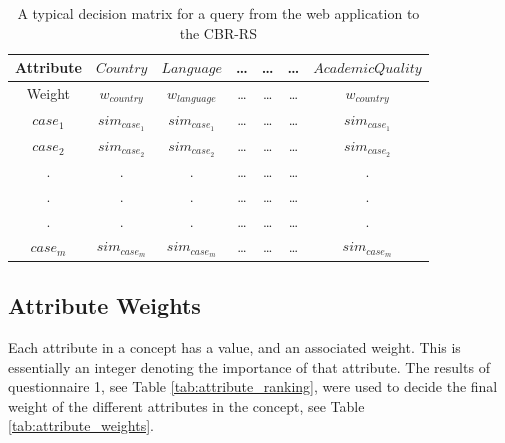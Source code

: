 \begin{table}[h]
\centering
\caption{A typical decision matrix for a query from the web application to the CBR-RS}
\label{tab:decision_matrix}
\begin{tabular}{|c|c|c|c|c|c|c|}
 \hline 
Attribute             & $Country$             & $Language$            & \ldots               & \ldots               & \ldots               & $AcademicQuality$     \\\hline 
Weight                & $w_{country}$         & $w_{language}$        & \ldots               & \ldots               & \ldots               & $w_{country}$         \\\hline \hline
$case_{1}$            & $sim_{case_{1}}$      & $sim_{case_{1}}$      & \ldots               & \ldots               & \ldots               & $sim_{case_{1}}$      \\
$case_{2}$            & $sim_{case_{2}}$      & $sim_{case_{2}}$      & \ldots               & \ldots               & \ldots               & $sim_{case_{2}}$      \\
. & . & . & \ldots               & \ldots               & \ldots               & . \\
. & . & . & \ldots               & \ldots               & \ldots               & . \\
. & . & . & \ldots               & \ldots               & \ldots               & . \\
$case_{m}$            & $sim_{case_{m}}$      & $sim_{case_{m}}$      & \ldots               & \ldots               & \ldots               & $sim_{case_{m}}$   \\ \hline 

\end{tabular}
\end{table}


\subsection{Attribute Weights}\label{sec:weighting}

Each attribute in a concept has a value, and an associated weight. This is essentially an integer denoting the importance of that attribute. The results of questionnaire 1, see Table \ref{tab:attribute_ranking}, were used to decide the final weight of the different attributes in the concept, see Table \ref{tab:attribute_weights}.

